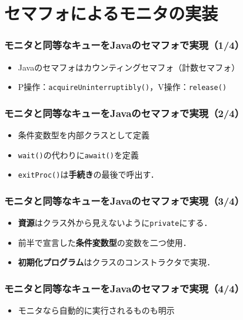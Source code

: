 \documentclass[dvipdfmx]{beamer}
\begin{document}
\section{セマフォによるモニタの実装}
\begin{frame}
  \frametitle{モニタと同等なキューをJavaのセマフォで実現（1/4）}
  

  \begin{itemize}
  \item Javaのセマフォはカウンティングセマフォ（計数セマフォ）
  \item P操作：{\tt acquireUninterruptibly()}，V操作：{\tt release()}
  \end{itemize}
\end{frame}

\begin{frame}
  \frametitle{モニタと同等なキューをJavaのセマフォで実現（2/4）}
  

  \begin{itemize}
  \item 条件変数型を内部クラスとして定義
  \item {\tt wait()}の代わりに{\tt await()}を定義
  \item {\tt exitProc()}は{\bf 手続き}の最後で呼出す．
  \end{itemize}
\end{frame}

\begin{frame}
  \frametitle{モニタと同等なキューをJavaのセマフォで実現（3/4）}
  

  \begin{itemize}
  \item {\bf 資源}はクラス外から見えないように{\tt private}にする．
  \item 前半で宣言した{\bf 条件変数型}の変数を二つ使用．
  \item {\bf 初期化プログラム}はクラスのコンストラクタで実現．
  \end{itemize}
\end{frame}

\begin{frame}
  \frametitle{モニタと同等なキューをJavaのセマフォで実現（4/4）}
  

  \begin{itemize}
  \item モニタなら自動的に実行されるものも明示
  \end{itemize}
\end{frame}
\end{document}
